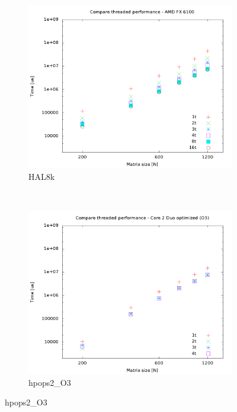 \documentclass[a4paper, 12pt]{article}
\begin{document}
\begin{figure}[H]
    \centering
    \begin{subfigure}[H]{0.5\textwidth}
        \includegraphics[width=\textwidth]{HAL_par_threads}
        \caption{HAL8k}
        \label{fig:8k_par_threads}
    \end{subfigure}%
    ~ %
    \begin{subfigure}[H]{0.5\textwidth}
        \includegraphics[width=\textwidth]{hpops2_O3_par_threads}
        \caption{hpops2\_O3}

\end{subfigure}
\end{figure}
\end{document}
